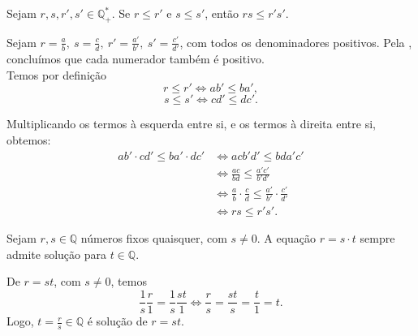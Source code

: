 \documentclass[../main.tex]{subfiles}
\begin{document}
\begin{prop}\label{rac-prop-produtoMaioresMaior}
    Sejam $r,s,r',s' \in \mathbb{Q}_{+}^*$. Se $r \leq r'$ e $s \leq s'$, então $rs \leq r's'$.
\end{prop}
\begin{dem}
    Sejam $r = \frac{a}{b},\ s = \frac{c}{d},\ r' = \frac{a'}{b'},\ s' = \frac{c'}{d'}$, com todos os denominadores positivos. Pela , concluímos que cada numerador também é positivo. \\
    Temos por definição
    \[ r \leq r' \iff ab' \leq ba', \]
    \[ s \leq s' \iff cd' \leq dc'. \]

    Multiplicando os termos à esquerda entre si, e os termos à direita entre si, obtemos:
     \begin{align*}
         ab' \cdot cd' \leq ba' \cdot dc' 
         &\iff acb'd' \leq bda'c' \\
         &\iff \frac{ac}{bd} \leq \frac{a'c'}{b'd'} \\
         &\iff \frac{a}{b} \cdot \frac{c}{d} \leq \frac{a'}{b'} \cdot \frac{c'}{d'} \\
         &\iff rs \leq r's'.
     \end{align*}
     
    
    
        
\end{dem}

\begin{prop}\label{rac-prop-solucaoAigualXB}
    Sejam $r,s \in \mathbb{Q}$ números fixos quaisquer, com $s \neq 0$. A equação $r = s \cdot t$ sempre admite solução para $t \in \mathbb{Q}$. 
\end{prop}
\begin{dem}
    De $r = st$, com $s \neq 0$, temos 
    \[ \frac{1}{s}\frac{r}{1} = \frac{1}{s}\frac{st}{1} \iff \frac{r}{s} = \frac{st}{s} = \frac{t}{1} = t. \]
    Logo, $t = \frac{r}{s} \in \mathbb{Q}$ é solução de $r=st$.
\end{dem}
\end{document}

